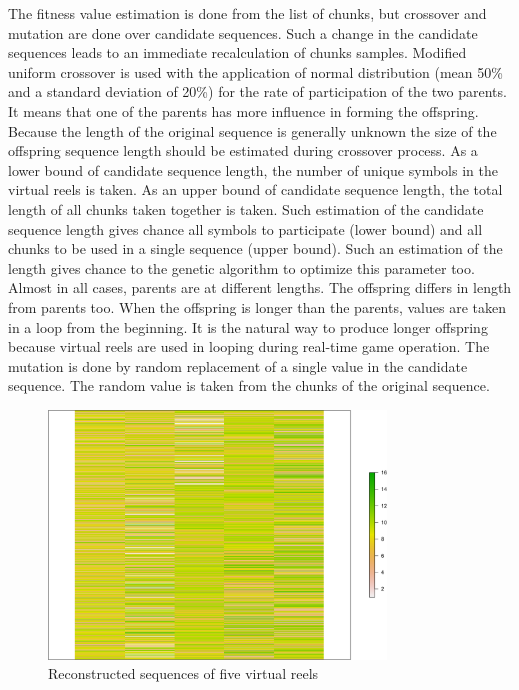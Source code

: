 \documentclass[11pt]{article}
\begin{document}
The fitness value estimation is done from the list of chunks, but crossover and mutation are done over candidate sequences. Such a change in the candidate sequences leads to an immediate recalculation of chunks samples. Modified uniform crossover is used with the application of normal distribution (mean 50\% and a standard deviation of 20\%) for the rate of participation of the two parents. It means that one of the parents has more influence in forming the offspring. Because the length of the original sequence is generally unknown the size of the offspring sequence length should be estimated during crossover process. As a lower bound of candidate sequence length, the number of unique symbols in the virtual reels is taken. As an upper bound of candidate sequence length, the total length of all chunks taken together is taken. Such estimation of the candidate sequence length gives chance all symbols to participate (lower bound) and all chunks to be used in a single sequence (upper bound). Such an estimation of the length gives chance to the genetic algorithm to optimize this parameter too. Almost in all cases, parents are at different lengths. The offspring differs in length from parents too. When the offspring is longer than the parents, values are taken in a loop from the beginning. It is the natural way to produce longer offspring because virtual reels are used in looping during real-time game operation. The mutation is done by random replacement of a single value in the candidate sequence. The random value is taken from the chunks of the original sequence. 

\begin{figure}[h!]
\centering
\includegraphics[width=0.8\textwidth]{fig02}
\caption{Reconstructed sequences of five virtual reels}
\label{fig:02}
\end{figure}
\end{document}
